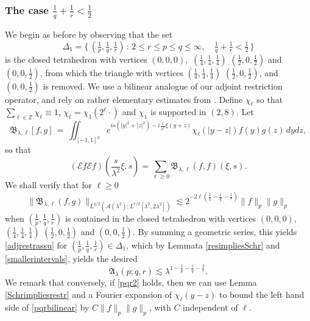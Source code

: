 \documentclass[11pt]{amsart}
\theoremstyle{definition}
\numberwithin{theorem}{section}
\numberwithin{definition}{section}
\numberwithin{equation}{section}
\newcommand{\Be}{\begin{equation}}
\newcommand{\Ee}{\end{equation}}
\renewcommand{\le}{\leqslant}
\renewcommand{\ge}{\geqslant}
\def\lc{\lesssim}
\def\eps{\varepsilon}
\def\la{\lambda}             \def\La{\Lambda}
\def\fA{{\mathfrak {A}}}
\def\fB{{\mathfrak {B}}}
\def\bbZ{{\mathbb {Z}}}
\def\cA{{\mathcal {A}}}
\def\cE{{\mathcal {E}}}
\renewcommand{\le}{\leqslant}
\renewcommand{\ge}{\geqslant}
\begin{document}
\subsubsection*{The case   $\frac1q+\frac1r<\frac12$}
We begin as before by
observing  that the set
\[\Delta_1=\big\{\,(\tfrac1p, \tfrac1q,\tfrac1r)\,:\,  2\le r\le p\le q\le \infty,\quad \tfrac1q+\tfrac1r< \tfrac12\,\big\}\]
is the closed tetrahedron with vertices $(0,0,0),$ $(\frac14, \frac14, \frac14)$
$(\frac12, 0,\frac12)$ and $(0, 0,\frac12)$, from which the triangle with vertices $(\frac14, \frac14, \frac14)$
$(\frac12, 0,\frac12)$, and $(0, 0,\frac12)$ is removed.
We use a bilinear analogue of our adjoint restriction operator, and
rely on rather elementary estimates from \cite{hoer2}.
Define $\chi_\ell$ so that $\sum_{\ell\in \bbZ} \chi_\ell\equiv 1$, $\chi_\ell = \chi_1(2^\ell\cdot)$ and
$\chi_1$ is supported in $(2, 8)$. Let
 $$\fB_{\la,\ell}[f,g]\,=\,
\iint_{[-1,1]^2}
e^{i s (|y|^2+|z|^2)-i\frac{ s }{\la^2}\xi({y+z})}\chi_\ell(|y-z|) f(y)g(z) \,
dy dz,
$$
so that
$$
(\cE f \cE f)(\frac{ s }{\lambda^2}\xi,  s ) =\sum_{\ell\ge 0} \fB_{\la,\ell}
(f,f)(\xi, s ).
$$
We shall verify that for $\ell\ge 0$
\Be %
\label{pqrbilinear}
\|\fB_{\la,\ell} (f,g)\|_{L^{q/2}(\cA(\la^2); L^{r/2}[\la^2, 2\la^2])}
 \lc 2^{-2\ell(\frac12-\frac 1q-\frac 1r)}
\|f\|_p \|g\|_p
\Ee %
when  $(\frac1p,\frac1q,\frac1r)$ is contained in the closed tetrahedron with vertices $(0,0,0),$ $(\frac14, \frac14, \frac14)$
$(\frac12, 0,\frac12)$ and $(0, 0,\frac12)$.  By summing a geometric series, this yields \eqref{adjrestrassu}  for $(\frac1p,\frac1q,\frac1r)\in \Delta_1$, which by  Lemmata \ref{resimpliesSchr} and \ref{smallerintervals}, yields the desired
\Be
\label{pqr2}
 \fA_\la(p;q,r)\lc \la^{1-\frac 1p-\frac 1q-\frac 2r}.
 \Ee
We remark that conversely, if \eqref{pqr2} holds,
then
we can use
 Lemma \ref{Schrimpliesrestr} and a Fourier
expansion of $\chi_\ell(y-z)$ to bound
the left hand side of \eqref{pqrbilinear}  by $C\|f\|_p\|g\|_p$,
with $C$ independent of $\ell$.
\end{document}
